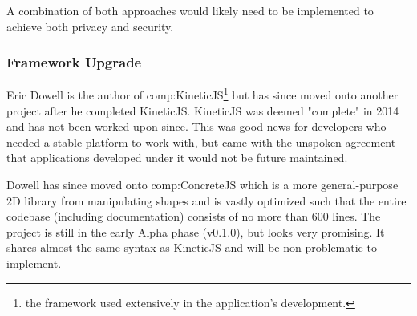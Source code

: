 A combination of both approaches would likely need to be implemented to achieve both privacy and security.


\subsubsection{Framework Upgrade}

Eric Dowell is the author of \gls{comp:KineticJS}\footnote{the framework used extensively in the application's development.} but has since moved onto another project after he completed KineticJS. KineticJS was deemed "complete" in 2014 \cite{kinetictar} and has not been worked upon since. This was good news for developers who needed a stable platform to work with, but came with the unspoken agreement that applications developed under it would not be future maintained.

Dowell has since moved onto \gls{comp:ConcreteJS} \cite{concretejs} which is a more general-purpose 2D library from manipulating shapes and is vastly optimized such that the entire codebase (including documentation) consists of no more than 600 lines. The project is still in the early Alpha phase (v0.1.0), but looks very promising. It shares almost the same syntax as KineticJS and will be non-problematic to implement.

